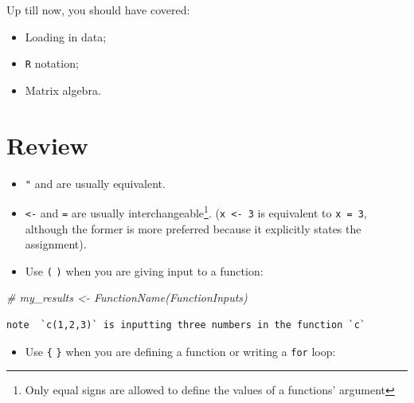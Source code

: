 \documentclass[]{book}
\newenvironment{Shaded}{\begin{snugshade}}{\end{snugshade}}
\newcommand{\CommentTok}[1]{\textcolor[rgb]{0.56,0.35,0.01}{\textit{#1}}}
\providecommand{\tightlist}{%
  \setlength{\itemsep}{0pt}\setlength{\parskip}{0pt}}
\let\rmarkdownfootnote\footnote%
\def\footnote{\protect\rmarkdownfootnote}
\theoremstyle{definition}
\theoremstyle{definition}
\theoremstyle{definition}
\theoremstyle{remark}
\begin{document}
Up till now, you should have covered:

\begin{itemize}
\tightlist
\item
  Loading in data;
\item
  \texttt{R} notation;
\item
  Matrix algebra.
\end{itemize}

\section{Review}\label{review}

\begin{itemize}
\tightlist
\item
  \texttt{"} and \texttt{\textquotesingle{}} are usually equivalent.
\item
  \texttt{\textless{}-} and \texttt{=} are usually
  interchangeable\footnote{Only equal signs are allowed to define the
    values of a functions' argument}. (\texttt{x\ \textless{}-\ 3} is
  equivalent to \texttt{x\ =\ 3}, although the former is more preferred
  because it explicitly states the assignment).
\item
  Use \texttt{(} \texttt{)} when you are giving input to a function:
\end{itemize}

\begin{Shaded}
\begin{Highlighting}[]
\CommentTok{# my_results <- FunctionName(FunctionInputs)}
\end{Highlighting}
\end{Shaded}

\begin{verbatim}
note  `c(1,2,3)` is inputting three numbers in the function `c`
\end{verbatim}

\begin{itemize}
\tightlist
\item
  Use \texttt{\{} \texttt{\}} when you are defining a function or
  writing a \texttt{for} loop:
\end{itemize}
\end{document}
